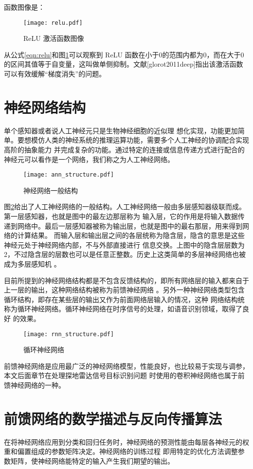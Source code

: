 函数图像是：
\begin{figure}[htbp]
	\texttt{[image: relu.pdf]}
	\caption{ReLU 激活函数图像}
	\label{relu}
\end{figure}

从公式\ref{eqn:relu}和图\ref{relu}可以观察到 ReLU 函数在小于0的范围内都为0，而在大于0的区间其值等于自变量，这叫做单侧抑制。文献[glorot2011deep]指出该激活函数可以有效缓解“梯度消失”的问题。

\section{神经网络结构}
单个感知器或者说人工神经元只是生物神经细胞的近似理
想化实现，功能更加简单。要想模仿人类的神经系统的推理运算功能，需要多个人工神经的协调配合实现高阶的抽象能力
并完成复杂的功能。通过特定的连接或信息传递方式进行配合的神经元可以看作是一个网络，我们称之为人工神经网络。

\begin{figure}[htbp]
	\texttt{[image: ann\_structure.pdf]}
	\caption{神经网络一般结构}
	\label{ann_structure}
\end{figure}

图\ref{ann_structure}给出了人工神经网络的一般结构。人工神经网络一般由多层感知器级联而成。第一层感知器，也就是图中的最左边那层称为
输入层，它的作用是将输入数据传递到网络中。最后一层感知器被称为输出层，也就是图中的最右那层，用来得到网络的计算结果。
而输入层和输出层之间的各层统称为隐含层，隐含的意思是这些神经元处于神经网络内部，不与外部直接进行
信息交换。上图中的隐含层层数为 2，不过隐含层的层数也可以是任意正整数。历史上这类简单的多层神经网络也被成为多层感知机
。

目前所提到的神经网络结构都是不包含反馈结构的，即所有网络层的输入都来自于上一层的输出，这种网络结构被称为前馈神经网络
。另外一种神经网络类型包含循环结构，即存在某些层的输出又作为前面网络层输入的情况，这种
网络结构统称为循环神经网络。循环神经网络在时序信号的处理，如语音识别领域，取得了良好
的效果。

\begin{figure}[htbp]
	\texttt{[image: rnn\_structure.pdf]}
	\caption{循环神经网络}
	\label{rnn_structure}
\end{figure}

前馈神经网络是应用最广泛的神经网络模型，性能良好，也比较易于实现与调参，本文后面章节在处理探地雷达信号目标识别问题
时使用的卷积神经网络也属于前馈神经网络的一种。

\section{前馈网络的数学描述与反向传播算法}
在将神经网络应用到分类和回归任务时，神经网络的预测性能由每层各神经元的权重和偏置组成的参数矩阵决定。神经网络的训练过程
即用特定的优化方法调整参数矩阵，使神经网络能特定的输入产生我们期望的输出。

